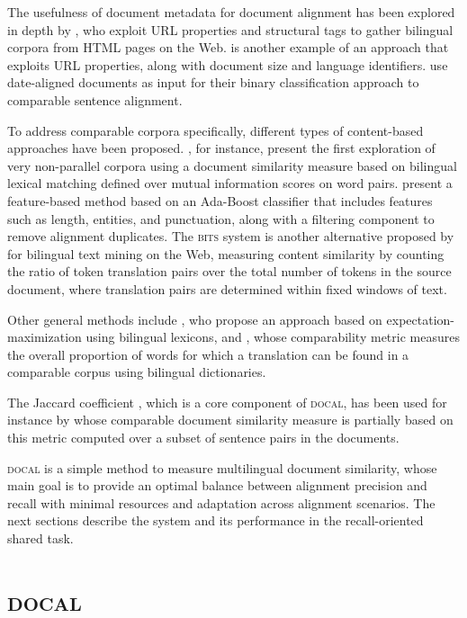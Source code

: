 \documentclass[11pt]{article}
\begin{document}
The usefulness of document metadata for document alignment has been explored in depth by \cite{resnik2003web}, who exploit URL properties and structural tags to gather bilingual corpora from HTML pages on the Web. \cite{Chen2000ptminer} is another example of an approach that exploits URL properties, along with document size and language identifiers. \cite{munteanu2005comp} use date-aligned documents as input for their binary classification approach to comparable sentence alignment. 

To address comparable corpora specifically, different types of content-based approaches have been proposed. \cite{fung2004mining}, for instance, present the first exploration of very non-parallel corpora using a document similarity measure based on bilingual lexical matching defined over mutual information scores on word pairs. \cite{Patry2005par} present a feature-based method based on an Ada-Boost classifier that includes features such as length, entities, and punctuation, along with a filtering component to remove alignment duplicates. The \textsc{bits} system is another alternative proposed by \cite{ma1999bits} for bilingual text mining on the Web, measuring content similarity by counting the ratio of token translation pairs over the total number of tokens in the source document, where translation pairs are determined within fixed windows of text. 

Other general methods include \cite{ion2011em}, who propose an approach based on expectation-maximization using bilingual lexicons, and  \cite{li2013exploiting}, whose comparability metric measures the overall proportion of words for which a translation can be found in a comparable corpus using bilingual dictionaries. 

The Jaccard coefficient \cite{Jaccard1901}, which is a core component of \textsc{docal},  has been used for instance by \cite{paramita2013ccmethods} whose comparable document similarity measure is partially based on this metric computed over a subset of sentence pairs in the documents. 

\textsc{docal} \cite{etche2016docal} is a simple method to measure multilingual document similarity, whose main goal is to provide an optimal balance between alignment precision and recall with minimal resources and adaptation across alignment scenarios. The next sections describe the system and its performance in the recall-oriented shared task.

\section{\textsc{docal}}
\label{docal}
\end{document}
